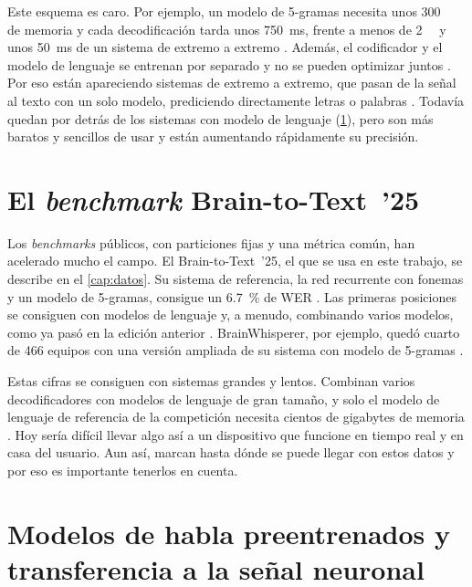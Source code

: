 Este esquema es caro. Por ejemplo, un modelo de 5-gramas necesita unos \SI{300}{\giga\byte} de memoria y cada decodificación tarda unos \SI{750}{\milli\second}, frente a menos de \SI{2}{\giga\byte} y unos \SI{50}{\milli\second} de un sistema de extremo a extremo \cite{brainwhisperer}. Además, el codificador y el modelo de lenguaje se entrenan por separado y no se pueden optimizar juntos \cite{crossspecies2025}. Por eso están apareciendo sistemas de extremo a extremo, que pasan de la señal al texto con un solo modelo, prediciendo directamente letras o palabras \cite{khanday2026,brainwhisperer}. Todavía quedan por detrás de los sistemas con modelo de lenguaje (\cref{sec:sota-benchmarks}), pero son más baratos y sencillos de usar y están aumentando rápidamente su precisión.

\section{El \textit{benchmark} Brain-to-Text~'25}
\label{sec:sota-benchmarks}

Los \textit{benchmarks} públicos, con particiones fijas y una métrica común, han acelerado mucho el campo. El Brain-to-Text~'25, el que se usa en este trabajo, se describe en el \cref{cap:datos}. Su sistema de referencia, la red recurrente con fonemas y un modelo de 5-gramas, consigue un \SI{6.7}{\percent} de WER \cite{brainwhisperer}. Las primeras posiciones se consiguen con modelos de lenguaje y, a menudo, combinando varios modelos, como ya pasó en la edición anterior \cite{b2t24lessons}. BrainWhisperer, por ejemplo, quedó cuarto de 466 equipos con una versión ampliada de su sistema con modelo de 5-gramas \cite{brainwhisperer}.

Estas cifras se consiguen con sistemas grandes y lentos. Combinan varios decodificadores con modelos de lenguaje de gran tamaño, y solo el modelo de lenguaje de referencia de la competición necesita cientos de gigabytes de memoria \cite{b2t25}. Hoy sería difícil llevar algo así a un dispositivo que funcione en tiempo real y en casa del usuario. Aun así, marcan hasta dónde se puede llegar con estos datos y por eso es importante tenerlos en cuenta. 


\section{Modelos de habla preentrenados y transferencia a la señal neuronal}
\label{sec:sota-habla}
\label{sec:sota-transferencia}

